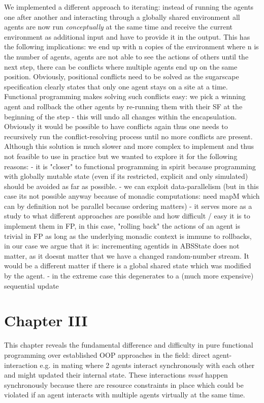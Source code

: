 We implemented a different approach to iterating: instead of running the agents one after another and interacting through a globally shared environment all agents are now run \textit{conceptually} at the same time and receive the current environment as additional input and have to provide it in the output. This has the following implications: we end up with n copies of the environment where n is the number of agents, agents are not able to see the actions of others until the next step, there can be conflicts where multiple agents end up on the same position. 
Obviously, positional conflicts need to be solved as the sugarscape specification clearly states that only one agent stays on a site at a time. Functional programming makes solving such conflicts easy: we pick a winning agent and rollback the other agents by re-running them with their SF at the beginning of the step - this will undo all changes within the encapsulation. Obviously it would be possible to have conflicts again thus one needs to recursively run the conflict-resolving process until no more conflicts are present.
Although this solution is much slower and more complex to implement and thus not feasible to use in practice but we wanted to explore it for the following reasons:
- it is "closer" to functional programming in spirit because programming with globally mutable state (even if its restricted, explicit and only simulated) should be avoided as far as possible.
- we can exploit data-parallelism (but in this case its not possible anyway because of monadic computations: need mapM which can by definition not be parallel because ordering matters)
- it serves more as a study to what different approaches are possible and how difficult / easy it is to implement them in FP, in this case, "rolling back" the actions of an agent is trivial in FP as long as the underlying monadic context is immune to rollbacks, in our case we argue that it is: incrementing agentids in ABSState does not matter, as it doesnt matter that we have a changed random-number stream. It would be a different matter if there is a global shared state which was modified by the agent.
- in the extreme case this degenerates to a (much more expensive) sequential update 

\section{Chapter III}
This chapter reveals the fundamental difference and difficulty in pure functional programming over established OOP approaches in the field: direct agent-interaction e.g. in mating where 2 agents interact synchronously with each other and might updated their internal state. These interactions \textit{must} happen synchronously because there are resource constraints in place which could be violated if an agent interacts with multiple agents virtually at the same time.

